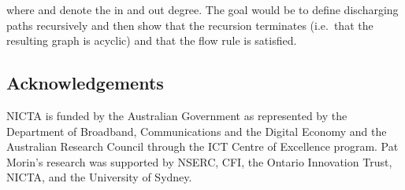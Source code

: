 \documentclass{patmorin}
\begin{document}
where  and  denote the in and out degree.  The goal would be
to define discharging paths recursively and then show that the recursion
terminates (i.e.~that the resulting graph is acyclic) and that the flow rule is satisfied.


\subsection*{Acknowledgements}
NICTA is funded by the Australian Government as represented by the
Department of Broadband, Communications and the Digital Economy and the
Australian Research Council through the ICT Centre of Excellence program.
Pat Morin's research was supported by NSERC, CFI, the Ontario Innovation Trust, NICTA, and the University of Sydney.


\end{document}

